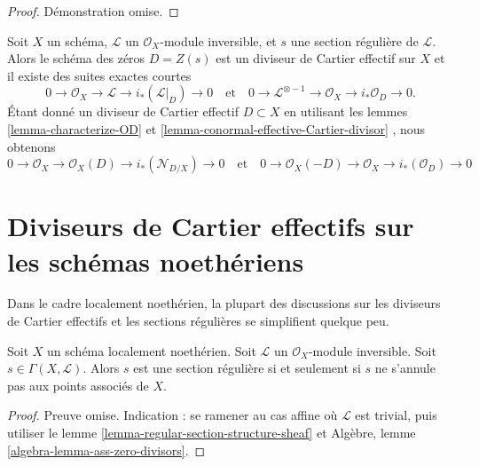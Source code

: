 \begin{proof}
Démonstration omise.
\end{proof}

\begin{remark}
\label{remark-ses-regular-section}
Soit  $X$  un schéma,  $\mathcal{L}$  un  $\mathcal{O}_X$-module inversible, et
 $s$  une section régulière de  $\mathcal{L}$. Alors le schéma des zéros
 $D = Z(s)$  est un diviseur de Cartier effectif sur  $X$  et il existe des
suites exactes courtes
$$
0 \to \mathcal{O}_X \to \mathcal{L} \to i_*(\mathcal{L}|_D) \to 0
\quad\text{et}\quad
0 \to \mathcal{L}^{\otimes -1} \to \mathcal{O}_X \to i_*\mathcal{O}_D \to 0.
$$
Étant donné un diviseur de Cartier effectif  $D \subset X$  en utilisant les lemmes
 \ref{lemma-characterize-OD}  et  \ref{lemma-conormal-effective-Cartier-divisor} , nous obtenons
$$
0 \to \mathcal{O}_X \to \mathcal{O}_X(D) \to i_*(\mathcal{N}_{D/X}) \to 0
\quad\text{et}\quad
0 \to \mathcal{O}_X(-D) \to \mathcal{O}_X \to i_*(\mathcal{O}_D) \to 0
$$
\end{remark}






\section{Diviseurs de Cartier effectifs sur les schémas noethériens}
\label{section-Noetherian-effective-Cartier}

\noindent
Dans le cadre localement noethérien, la plupart des discussions sur les diviseurs
de Cartier effectifs et les sections régulières se simplifient quelque peu.

\begin{lemma}
\label{lemma-regular-section-associated-points}
Soit  $X$  un schéma localement noethérien. Soit  $\mathcal{L}$  un
 $\mathcal{O}_X$-module inversible. Soit  $s \in \Gamma(X, \mathcal{L})$. Alors  $s$  est une
section régulière si et seulement si  $s$  ne s'annule pas aux points
associés de  $X$.
\end{lemma}

\begin{proof}
 Preuve omise. Indication : se ramener au cas affine où  $\mathcal{L}$  est trivial, puis utiliser le
lemme  \ref{lemma-regular-section-structure-sheaf}  et Algèbre, lemme  \ref{algebra-lemma-ass-zero-divisors}.
\end{proof}

